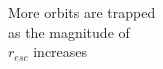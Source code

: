 \documentclass[preview]{standalone}
\begin{document}
More orbits are trapped\\as the magnitude of\\$r_{esc}$ increases\\
\end{document}
